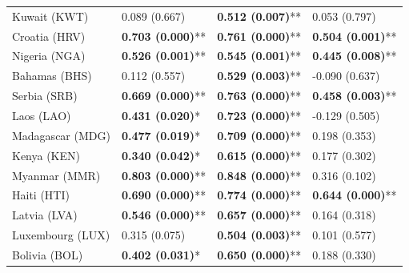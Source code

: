 \begin{longtable}{p{5cm}p{3cm}p{3cm}p{5cm}}
Kuwait (KWT) & \textcolor{atlOrange600}{0.089 (0.667)} & \textcolor{atlLime600}{\textbf{0.512 (0.007)}**} & \textcolor{atlOrange600}{0.053 (0.797)} \\
Croatia (HRV) & \textcolor{atlLime600}{\textbf{0.703 (0.000)}**} & \textcolor{atlLime600}{\textbf{0.761 (0.000)}**} & \textcolor{atlLime600}{\textbf{0.504 (0.001)}**} \\
Nigeria (NGA) & \textcolor{atlLime600}{\textbf{0.526 (0.001)}**} & \textcolor{atlLime600}{\textbf{0.545 (0.001)}**} & \textcolor{atlLime600}{\textbf{0.445 (0.008)}**} \\
Bahamas (BHS) & \textcolor{atlOrange600}{0.112 (0.557)} & \textcolor{atlLime600}{\textbf{0.529 (0.003)}**} & \textcolor{atlOrange600}{-0.090 (0.637)} \\
Serbia (SRB) & \textcolor{atlLime600}{\textbf{0.669 (0.000)}**} & \textcolor{atlLime600}{\textbf{0.763 (0.000)}**} & \textcolor{atlLime600}{\textbf{0.458 (0.003)}**} \\
Laos (LAO) & \textcolor{atlLime600}{\textbf{0.431 (0.020)}*} & \textcolor{atlLime600}{\textbf{0.723 (0.000)}**} & \textcolor{atlOrange600}{-0.129 (0.505)} \\
Madagascar (MDG) & \textcolor{atlLime600}{\textbf{0.477 (0.019)}*} & \textcolor{atlLime600}{\textbf{0.709 (0.000)}**} & \textcolor{atlOrange600}{0.198 (0.353)} \\
Kenya (KEN) & \textcolor{atlLime600}{\textbf{0.340 (0.042)}*} & \textcolor{atlLime600}{\textbf{0.615 (0.000)}**} & \textcolor{atlOrange600}{0.177 (0.302)} \\
Myanmar (MMR) & \textcolor{atlLime600}{\textbf{0.803 (0.000)}**} & \textcolor{atlLime600}{\textbf{0.848 (0.000)}**} & \textcolor{atlOrange600}{0.316 (0.102)} \\
Haiti (HTI) & \textcolor{atlLime600}{\textbf{0.690 (0.000)}**} & \textcolor{atlLime600}{\textbf{0.774 (0.000)}**} & \textcolor{atlLime600}{\textbf{0.644 (0.000)}**} \\
Latvia (LVA) & \textcolor{atlLime600}{\textbf{0.546 (0.000)}**} & \textcolor{atlLime600}{\textbf{0.657 (0.000)}**} & \textcolor{atlOrange600}{0.164 (0.318)} \\
Luxembourg (LUX) & \textcolor{atlOrange600}{0.315 (0.075)} & \textcolor{atlLime600}{\textbf{0.504 (0.003)}**} & \textcolor{atlOrange600}{0.101 (0.577)} \\
Bolivia (BOL) & \textcolor{atlLime600}{\textbf{0.402 (0.031)}*} & \textcolor{atlLime600}{\textbf{0.650 (0.000)}**} & \textcolor{atlOrange600}{0.188 (0.330)} \\

\end{longtable}

